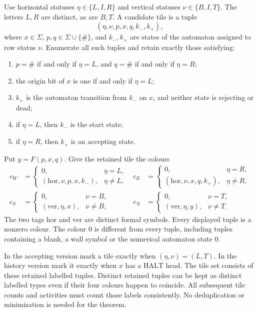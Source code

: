 \documentclass[11pt,reqno]{amsart}
\numberwithin{equation}{section}
\theoremstyle{definition}
\theoremstyle{remark}
\begin{document}
Use horizontal statuses $\eta\in\{L,I,R\}$ and vertical statuses
$\nu\in\{B,I,T\}$.  The letters $L,R$ are distinct, as are $B,T$.
A candidate tile is a tuple
\begin{equation}
\label{appcomp:tuple}
(\eta,\nu,p,x,q,k_-,k_+),
\end{equation}
where $x\in\Sigma$, $p,q\in\Sigma\cup\{\#\}$, and $k_-,k_+$
are states of the automaton assigned to row status $\nu$.
Enumerate all such tuples and retain exactly those satisfying:
\begin{enumerate}
\item $p=\#$ if and only if $\eta=L$, and $q=\#$ if and only if
$\eta=R$;
\item the origin bit of $x$ is one if and only if $\eta=L$;
\item $k_+$ is the automaton transition from $k_-$ on $x$, and neither
state is rejecting or dead;
\item if $\eta=L$, then $k_-$ is the start state;
\item if $\eta=R$, then $k_+$ is an accepting state.
\end{enumerate}
Put $y=F(p,x,q)$.  Give the retained tile the colours
\begin{align}
\label{appcomp:colours}
 c_W&=\begin{cases}0,&\eta=L,\\
 (\mathrm{hor},\nu,p,x,k_-),&\eta\ne L,
 \end{cases}
&c_E&=\begin{cases}0,&\eta=R,\\
 (\mathrm{hor},\nu,x,q,k_+),&\eta\ne R,
 \end{cases}\\
 c_S&=\begin{cases}0,&\nu=B,\\
 (\mathrm{ver},\eta,x),&\nu\ne B,
 \end{cases}
&c_N&=\begin{cases}0,&\nu=T,\\
 (\mathrm{ver},\eta,y),&\nu\ne T.
 \end{cases}\nonumber
\end{align}
The two tags $\mathrm{hor}$ and $\mathrm{ver}$ are distinct formal
symbols.  Every displayed tuple is a nonzero colour.  The colour $0$
is different from every tuple, including tuples containing a blank,
a wall symbol or the numerical automaton state $0$.

In the accepting version mark a tile exactly when $(\eta,\nu)=(L,T)$.
In the history version mark it exactly when $x$ has a
$\mathrm{HALT}$ head.  The tile set consists of these retained labelled
tuples.  Distinct retained tuples can be kept as distinct labelled types
even if their four colours happen to coincide.  All subsequent tile
counts and activities must count those labels consistently.  No
deduplication or minimization is needed for the theorem.
\end{document}
